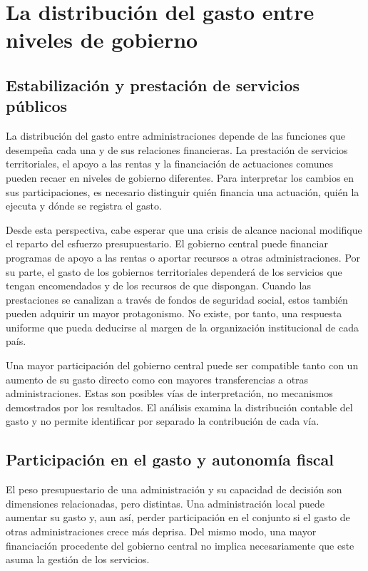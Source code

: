 \documentclass[11pt,a4paper]{article}
\begin{document}
\section{La distribución del gasto entre niveles de gobierno}
\subsection{Estabilización y prestación de servicios públicos}
La distribución del gasto entre administraciones depende de las funciones que desempeña cada una y de sus relaciones financieras. La prestación de servicios territoriales, el apoyo a las rentas y la financiación de actuaciones comunes pueden recaer en niveles de gobierno diferentes. Para interpretar los cambios en sus participaciones, es necesario distinguir quién financia una actuación, quién la ejecuta y dónde se registra el gasto.

Desde esta perspectiva, cabe esperar que una crisis de alcance nacional modifique el reparto del esfuerzo presupuestario. El gobierno central puede financiar programas de apoyo a las rentas o aportar recursos a otras administraciones. Por su parte, el gasto de los gobiernos territoriales dependerá de los servicios que tengan encomendados y de los recursos de que dispongan. Cuando las prestaciones se canalizan a través de fondos de seguridad social, estos también pueden adquirir un mayor protagonismo. No existe, por tanto, una respuesta uniforme que pueda deducirse al margen de la organización institucional de cada país.

Una mayor participación del gobierno central puede ser compatible tanto con un aumento de su gasto directo como con mayores transferencias a otras administraciones. Estas son posibles vías de interpretación, no mecanismos demostrados por los resultados. El análisis examina la distribución contable del gasto y no permite identificar por separado la contribución de cada vía.

\subsection{Participación en el gasto y autonomía fiscal}
El peso presupuestario de una administración y su capacidad de decisión son dimensiones relacionadas, pero distintas. Una administración local puede aumentar su gasto y, aun así, perder participación en el conjunto si el gasto de otras administraciones crece más deprisa. Del mismo modo, una mayor financiación procedente del gobierno central no implica necesariamente que este asuma la gestión de los servicios.
\end{document}
